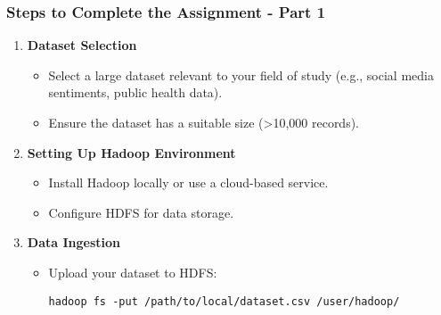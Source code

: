 \documentclass[aspectratio=169]{beamer}
\begin{document}
\begin{frame}[fragile]
    \frametitle{Steps to Complete the Assignment - Part 1}
    \begin{enumerate}
        \item \textbf{Dataset Selection}
            \begin{itemize}
                \item Select a large dataset relevant to your field of study (e.g., social media sentiments, public health data).
                \item Ensure the dataset has a suitable size (>10,000 records).
            \end{itemize}
        
        \item \textbf{Setting Up Hadoop Environment}
            \begin{itemize}
                \item Install Hadoop locally or use a cloud-based service.
                \item Configure HDFS for data storage.
            \end{itemize}
        
        \item \textbf{Data Ingestion}
            \begin{itemize}
                \item Upload your dataset to HDFS:
                \begin{lstlisting}[language=Shell]
hadoop fs -put /path/to/local/dataset.csv /user/hadoop/
                \end{lstlisting}
            \end{itemize}
    \end{enumerate}
\end{frame}
\end{document}

